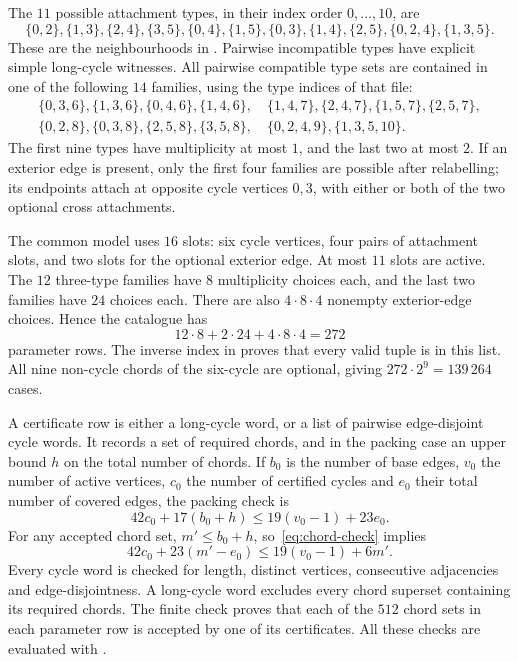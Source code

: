 The $11$ possible attachment types, in their index order $0,\ldots,10$, are
\[
 \{0,2\},\{1,3\},\{2,4\},\{3,5\},\{0,4\},\{1,5\},
 \{0,3\},\{1,4\},\{2,5\},\{0,2,4\},\{1,3,5\}.
\]
These are the neighbourhoods in . Pairwise incompatible types have explicit
simple long-cycle witnesses. All pairwise compatible type sets are
contained in one of the following $14$ families, using the type indices of
that file:
\[
\begin{gathered}
\{0,3,6\},\{1,3,6\},\{0,4,6\},\{1,4,6\},\quad
\{1,4,7\},\{2,4,7\},\{1,5,7\},\{2,5,7\},\\
\{0,2,8\},\{0,3,8\},\{2,5,8\},\{3,5,8\},\quad
\{0,2,4,9\},\{1,3,5,10\}.
\end{gathered}
\]
The first nine types have multiplicity at most $1$, and the last two at
most $2$. If an exterior edge is present, only the first four families
are possible after relabelling; its endpoints attach at opposite cycle
vertices $0,3$, with either or both of the two optional cross attachments.

The common model uses $16$ slots: six cycle vertices, four pairs of
attachment slots, and two slots for the optional exterior edge. At most
$11$ slots are active. The $12$ three-type families have $8$ multiplicity
choices each, and the last two families have $24$ choices each. There are
also $4\cdot8\cdot4$ nonempty exterior-edge choices. Hence the catalogue
has
\[
                       12\cdot8+2\cdot24+4\cdot8\cdot4=272
\]
parameter rows. The inverse index in 
proves that every valid tuple is in this list. All nine non-cycle chords
of the six-cycle are optional, giving $272\cdot2^9=139\,264$ cases.

A certificate row is either a long-cycle word, or a list of pairwise
edge-disjoint cycle words. It records a set of required chords, and in
the packing case an upper bound $h$ on the total number of chords.
If $b_0$ is the number of base edges, $v_0$ the number of active vertices,
$c_0$ the number of certified cycles and $e_0$ their total number of
covered edges, the packing check is
\begin{equation}\label{eq:chord-check}
          42c_0+17(b_0+h)\le19(v_0-1)+23e_0.
\end{equation}
For any accepted chord set, $m'\le b_0+h$, so~\eqref{eq:chord-check}
implies
\[
                  42c_0+23(m'-e_0)\le19(v_0-1)+6m'.
\]
Every cycle word is checked for length, distinct vertices, consecutive
adjacencies and edge-disjointness. A long-cycle word excludes every chord
superset containing its required chords. The finite check proves that each
of the $512$ chord sets in each parameter row is accepted by one of its
certificates. All these checks are evaluated with .

